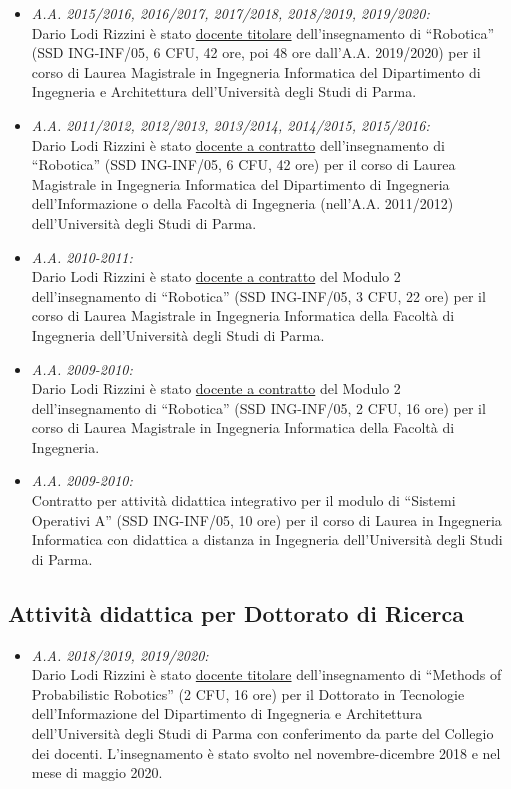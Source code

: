 \documentclass[11pt]{article}
\newcommand{\ITEMDATE}[1]{\item \textit{#1:}\\}
\begin{document}
\begin{itemize}
\ITEMDATE{A.A. 2015/2016, 2016/2017, 2017/2018, 2018/2019, 2019/2020}
Dario Lodi Rizzini \`e stato \underline{docente titolare} dell'insegnamento di ``Robotica'' (SSD ING-INF/05, 6 CFU, 42 ore, poi 48 ore dall'A.A. 2019/2020)
per il corso di Laurea Magistrale in Ingegneria Informatica del Dipartimento di Ingegneria e Architettura 
dell'Universit\`a degli Studi di Parma.

\ITEMDATE{A.A. 2011/2012, 2012/2013, 2013/2014, 2014/2015, 2015/2016}
Dario Lodi Rizzini \`e stato \underline{docente a contratto} dell'insegnamento di ``Robotica'' (SSD ING-INF/05, 6 CFU, 42 ore)
per il corso di Laurea Magistrale in Ingegneria Informatica del Dipartimento di Ingegneria dell'Informazione 
o della Facolt\`a di Ingegneria (nell'A.A. 2011/2012)
dell'Universit\`a degli Studi di Parma.


\ITEMDATE{A.A. 2010-2011}
Dario Lodi Rizzini \`e stato \underline{docente a contratto} del Modulo 2 dell'insegnamento di ``Robotica'' 
(SSD ING-INF/05, 3 CFU, 22 ore) per il corso di Laurea Magistrale in Ingegneria Informatica 
della Facolt\`a di Ingegneria dell'Universit\`a degli Studi di Parma.

\ITEMDATE{A.A. 2009-2010}
Dario Lodi Rizzini \`e stato \underline{docente a contratto} del Modulo 2 dell'insegnamento di ``Robotica'' 
(SSD ING-INF/05, 2 CFU, 16 ore) per il corso di Laurea Magistrale in Ingegneria Informatica della Facolt\`a di Ingegneria.

\ITEMDATE{A.A. 2009-2010}
Contratto per attivit\`a didattica integrativo per il modulo di
``Sistemi Operativi A'' (SSD ING-INF/05, 10 ore) per il corso di Laurea in Ingegneria Informatica con didattica a 
distanza in Ingegneria dell'Universit\`a degli Studi di Parma.
\end{itemize}

\subsection*{Attivit\`a didattica per Dottorato di Ricerca}

\begin{itemize}

\ITEMDATE{A.A. 2018/2019, 2019/2020}
Dario Lodi Rizzini \`e stato \underline{docente titolare} dell'insegnamento di ``Methods of Probabilistic Robotics'' (2 CFU, 16 ore)
per il Dottorato in Tecnologie dell'Informazione del Dipartimento di Ingegneria e Architettura 
dell'Universit\`a degli Studi di Parma con conferimento da parte del Collegio dei docenti. 
L'insegnamento \`e stato svolto nel novembre-dicembre 2018 e nel mese di maggio 2020. 

\end{itemize}
\end{document}
